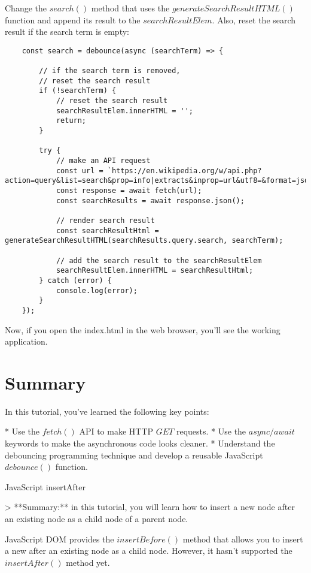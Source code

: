 \documentclass[11pt]{article}
\begin{document}
Change the $search()$ method that uses the $generateSearchResultHTML()$
function and append its result to the $searchResultElem$.
Also, reset the search result if the search term is empty:

\begin{lstlisting}
    const search = debounce(async (searchTerm) => {

        // if the search term is removed, 
        // reset the search result
        if (!searchTerm) {
            // reset the search result
            searchResultElem.innerHTML = '';
            return;
        }

        try {
            // make an API request
            const url = `https://en.wikipedia.org/w/api.php?action=query&list=search&prop=info|extracts&inprop=url&utf8=&format=json&origin=*&srlimit=10&srsearch=${searchTerm}`;
            const response = await fetch(url);
            const searchResults = await response.json();

            // render search result
            const searchResultHtml = generateSearchResultHTML(searchResults.query.search, searchTerm);

            // add the search result to the searchResultElem
            searchResultElem.innerHTML = searchResultHtml;
        } catch (error) {
            console.log(error);
        }
    });
\end{lstlisting}

Now, if you open the index.html in the web browser, you'll see the
working application.

\section*{Summary}

In this tutorial, you've learned the following key points:

* Use the $fetch()$ API to make HTTP $GET$ requests.
* Use the $async/await$ keywords to make the asynchronous code
looks cleaner.
* Understand the debouncing programming technique and develop a
reusable JavaScript $debounce()$ function.

{\huge JavaScript insertAfter}

> **Summary:** in this tutorial, you will learn how to insert a
new node after an existing node as a child node of a parent node.

JavaScript DOM provides the $insertBefore()$ method that allows
you to insert a new after an existing node as a child node.
However, it hasn't supported the $insertAfter()$ method yet.
\end{document}
